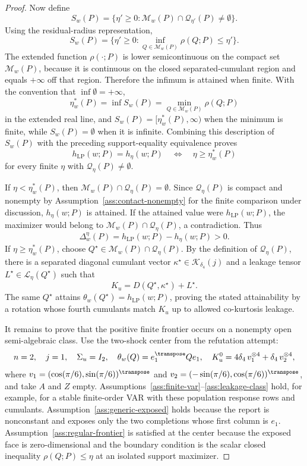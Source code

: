 \begin{proof}
Now define
\[
S_w(P)=\{\eta'\ge0:\mathcal M_w(P)\cap\mathcal Q_{\eta'}(P)\ne\emptyset\}.
\]
Using the residual-radius representation,
\[
S_w(P)=\{\eta'\ge0:\inf_{Q\in\mathcal M_w(P)}\rho(Q;P)\le \eta'\}.
\]
The extended function \(\rho(\cdot;P)\) is lower semicontinuous on the compact set \(\mathcal M_w(P)\), because it is continuous on the closed separated-cumulant region and equals \(+\infty\) off that region.  Therefore the infimum is attained when finite.  With the convention that \(\inf\emptyset=+\infty\),
\[
\eta_w^*(P)
=\inf S_w(P)
=\min_{Q\in\mathcal M_w(P)}\rho(Q;P)
\]
in the extended real line, and \(S_w(P)=[\eta_w^*(P),\infty)\) when the minimum is finite, while \(S_w(P)=\emptyset\) when it is infinite.  Combining this description of \(S_w(P)\) with the preceding support-equality equivalence proves
\[
h_{\mathrm{LP}}(w;P)=h_\eta(w;P)
\quad\Longleftrightarrow\quad
\eta\ge\eta_w^*(P)
\]
for every finite \(\eta\) with \(\mathcal Q_\eta(P)\ne\emptyset\).

If \(\eta<\eta_w^*(P)\), then \(\mathcal M_w(P)\cap\mathcal Q_\eta(P)=\emptyset\).  Since \(\mathcal Q_\eta(P)\) is compact and nonempty by Assumption~\ref{ass:contact-nonempty} for the finite comparison under discussion, \(h_\eta(w;P)\) is attained.  If the attained value were \(h_{\mathrm{LP}}(w;P)\), the maximizer would belong to \(\mathcal M_w(P)\cap\mathcal Q_\eta(P)\), a contradiction.  Thus
\[
\Delta_w^\eta(P)=h_{\mathrm{LP}}(w;P)-h_\eta(w;P)>0 .
\]
If \(\eta\ge\eta_w^*(P)\), choose \(Q^\star\in\mathcal M_w(P)\cap\mathcal Q_\eta(P)\).  By the definition of \(\mathcal Q_\eta(P)\), there is a separated diagonal cumulant vector \(\kappa^\star\in\mathcal K_{\delta_4}(j)\) and a leakage tensor \(L^\star\in\mathcal L_\eta(Q^\star)\) such that
\[
K_u=D(Q^\star,\kappa^\star)+L^\star .
\]
The same \(Q^\star\) attains \(\theta_w(Q^\star)=h_{\mathrm{LP}}(w;P)\), proving the stated attainability by a rotation whose fourth cumulants match \(K_u\) up to allowed co-kurtosis leakage.

It remains to prove that the positive finite frontier occurs on a nonempty open semi-algebraic class.  Use the two-shock center from the refutation attempt:
\[
n=2,\quad j=1,\quad \Sigma_u=I_2,\quad
\theta_w(Q)=e_1^\transpose Qe_1,\quad
K_u^0=4\delta_4\,v_1^{\otimes4}+\delta_4\,v_2^{\otimes4},
\]
where \(v_1=(\cos(\pi/6),\sin(\pi/6))^\transpose\) and \(v_2=(-\sin(\pi/6),\cos(\pi/6))^\transpose\), and take \(A\) and \(Z\) empty.  Assumptions~\ref{ass:finite-var}--\ref{ass:leakage-class} hold, for example, for a stable finite-order VAR with these population response rows and cumulants.  Assumption~\ref{ass:generic-exposed} holds because the report is nonconstant and exposes only the two completions whose first column is \(e_1\).  Assumption~\ref{ass:regular-frontier} is satisfied at the center because the exposed face is zero-dimensional and the boundary condition is the scalar closed inequality \(\rho(Q;P)\le\eta\) at an isolated support maximizer.


\end{proof}
